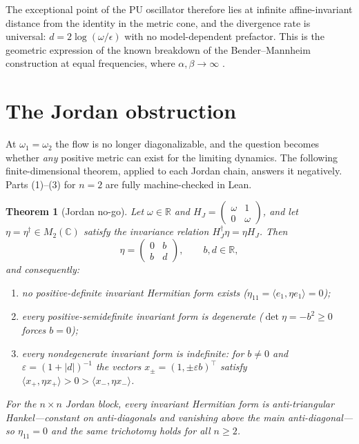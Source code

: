 \documentclass[11pt]{article}
\newtheorem{theorem}{Theorem}[section]
\theoremstyle{definition}
\theoremstyle{remark}
\newcommand{\C}{\mathbb{C}}
\newcommand{\R}{\mathbb{R}}
\newcommand{\w}{\omega}
\newcommand{\dg}{\dagger}
\begin{document}
The exceptional point of the PU oscillator therefore lies at infinite
affine-invariant distance from the identity in the metric cone, and the
divergence rate is universal: $d=2\log(\w/\epsilon)$ with no
model-dependent prefactor.  This is the geometric expression of the known
breakdown of the Bender--Mannheim construction at equal frequencies, where
$\alpha,\beta\to\infty$ \cite{BM2008PRD}.

\section{The Jordan obstruction}\label{sec:jordan}

At $\w_1=\w_2$ the flow is no longer diagonalizable, and the question becomes
whether \emph{any} positive metric can exist for the limiting dynamics.  The
following finite-dimensional theorem, applied to each Jordan chain, answers
it negatively.  Parts (1)--(3) for $n=2$ are fully machine-checked in Lean.

\begin{theorem}[Jordan no-go]\label{thm:jordan}
Let $\w\in\R$ and
$H_J=\left(\begin{smallmatrix}\w&1\\0&\w\end{smallmatrix}\right)$, and let
$\eta=\eta^{\dg}\in M_2(\C)$ satisfy the invariance relation
$H_J^{\dg}\eta=\eta H_J$.  Then
\begin{equation}
\eta=\begin{pmatrix}0&b\\ b&d\end{pmatrix},\qquad b,d\in\R ,
\end{equation}
and consequently:
\begin{enumerate}
\item no positive-definite invariant Hermitian form exists
($\eta_{11}=\langle e_1,\eta e_1\rangle=0$);
\item every positive-semidefinite invariant form is degenerate
($\det\eta=-b^2\ge0$ forces $b=0$);
\item every nondegenerate invariant form is indefinite: for $b\neq0$ and
$\varepsilon=(1+|d|)^{-1}$ the vectors $x_\pm=(1,\pm\varepsilon b)^{\top}$
satisfy $\langle x_+,\eta x_+\rangle>0>\langle x_-,\eta x_-\rangle$.
\end{enumerate}
For the $n\times n$ Jordan block, every invariant Hermitian form is
anti-triangular Hankel---constant on anti-diagonals and vanishing above the
main anti-diagonal---so $\eta_{11}=0$ and the same trichotomy holds for all
$n\ge2$.
\end{theorem}
\end{document}
